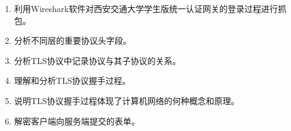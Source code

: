 \begin{enumerate}
	\item 利用Wireshark软件对西安交通大学学生版统一认证网关的登录过程进行抓包。
	\item 分析不同层的重要协议头字段。
	\item 分析TLS协议中记录协议与其子协议的关系。
	\item 理解和分析TLS协议握手过程。
	\item 说明TLS协议握手过程体现了计算机网络的何种概念和原理。
	\item 解密客户端向服务端提交的表单。
\end{enumerate}